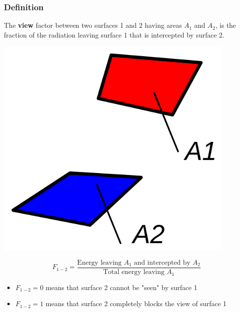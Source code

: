 \documentclass[11pt]{article}
\begin{document}
\subsubsection{Definition}
\label{sec:org6dae307}
The \textbf{view} factor between two surfaces 1 and 2 having areas \(A_1\) and \(A_2\), is the fraction of the radiation leaving surface 1 that is intercepted by surface 2.
\begin{center}
\includegraphics[width=.9\linewidth]{./images/view-factor-surfaces-a1-and-a2-diagram.png}
\end{center}
\[F_{1-2} = \frac{\text{Energy leaving $A_1$ and intercepted by $A_2$}}{\text{Total energy leaving $A_1$}}\]

\begin{itemize}
\item \(F_{1-2} = 0\) means that surface 2 cannot be "seen" by surface 1
\item \(F_{1-2} = 1\) means that surface 2 completely blocks the view of surface 1
\end{itemize}
\end{document}
